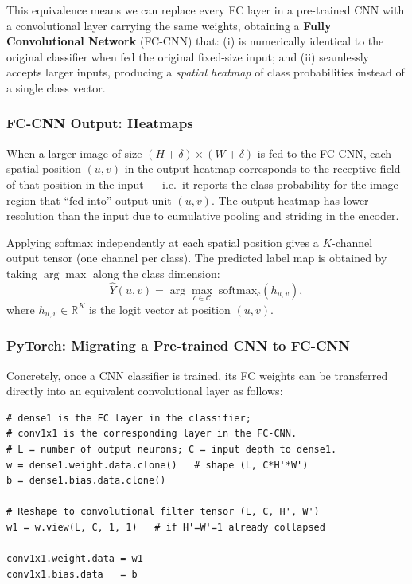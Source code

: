 \documentclass[11pt,a4paper]{article}
\newcommand{\term}[1]{\textcolor{DefGreen}{\textbf{#1}}}
\begin{document}
This equivalence means we can replace every FC layer in a pre-trained CNN with a convolutional layer carrying the same weights, obtaining a \term{Fully Convolutional Network} (FC-CNN) that: (i) is numerically identical to the original classifier when fed the original fixed-size input; and (ii) seamlessly accepts larger inputs, producing a \emph{spatial heatmap} of class probabilities instead of a single class vector.

\subsubsection{FC-CNN Output: Heatmaps}

When a larger image of size $(H + \delta) \times (W + \delta)$ is fed to the FC-CNN, each spatial position $(u,v)$ in the output heatmap corresponds to the receptive field of that position in the input — i.e.\ it reports the class probability for the image region that ``fed into'' output unit $(u,v)$. The output heatmap has lower resolution than the input due to cumulative pooling and striding in the encoder.

Applying softmax independently at each spatial position gives a $K$-channel output tensor (one channel per class). The predicted label map is obtained by taking $\arg\max$ along the class dimension:
\[
  \hat{Y}(u,v) = \arg\max_{c \in \mathcal{C}} \; \text{softmax}_c\!\left(h_{u,v}\right),
\]
where $h_{u,v} \in \mathbb{R}^K$ is the logit vector at position $(u,v)$.

\subsubsection{PyTorch: Migrating a Pre-trained CNN to FC-CNN}

Concretely, once a CNN classifier is trained, its FC weights can be transferred directly into an equivalent convolutional layer as follows:

\begin{lstlisting}[caption={Migrating a dense layer to a 1$\times$1 convolutional layer in PyTorch}]
# dense1 is the FC layer in the classifier;
# conv1x1 is the corresponding layer in the FC-CNN.
# L = number of output neurons; C = input depth to dense1.
w = dense1.weight.data.clone()   # shape (L, C*H'*W')
b = dense1.bias.data.clone()

# Reshape to convolutional filter tensor (L, C, H', W')
w1 = w.view(L, C, 1, 1)   # if H'=W'=1 already collapsed

conv1x1.weight.data = w1
conv1x1.bias.data   = b
\end{lstlisting}
\end{document}
